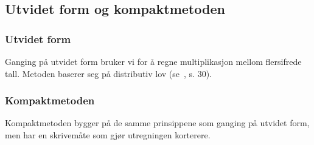 \subsection{Utvidet form og kompaktmetoden}
\subsubsection{Utvidet form}
Ganging på utvidet form bruker vi for å regne multiplikasjon mellom flersifrede tall. Metoden baserer seg på distributiv lov (se \mb\,, s. 30). \regv
{}
\newpage
{}
\subsubsection{Kompaktmetoden}
Kompaktmetoden bygger på de samme prinsippene som ganging på utvidet form, men har en skrivemåte som gjør utregningen korterere. \regv

